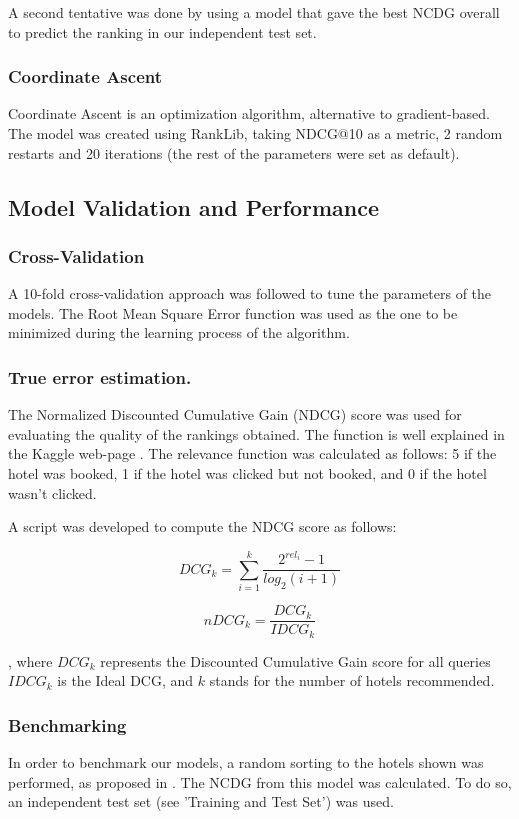 \documentclass[9pt]{llncs}
\begin{document}
A second tentative was done by using a model that gave the best NCDG overall to predict the ranking in our independent test set.

\subsubsection{Coordinate Ascent}
Coordinate Ascent is an optimization algorithm, alternative to gradient-based.
The model was created using RankLib, taking NDCG@10 as a metric, 2 random restarts and 20 iterations (the rest of the parameters were set as default).


\subsection{Model Validation and Performance}
\subsubsection{Cross-Validation}
A 10-fold cross-validation approach was followed to tune the parameters of the models. The Root Mean Square Error function was used as the one to be minimized during the learning process of the algorithm.
\subsubsection{True error estimation.}
The Normalized Discounted Cumulative Gain (NDCG) score was used for evaluating the quality of the rankings obtained. 
The function is well explained in the Kaggle web-page \cite{NDCG}.
The relevance function was calculated as follows: 5 if the hotel was booked, 1 if the hotel was clicked but not booked, and 0 if the hotel wasn't clicked.

A script was developed to compute the NDCG score as follows:

\begin{equation}
DCG_k = \sum_{i=1}^{k} \frac{2^{rel_i}-1}{log_2 (i+1)}
\end{equation}

\begin{equation}
nDCG_k = \frac{DCG_k}{IDCG_k}
\end{equation}

, where $DCG_k$ represents the Discounted Cumulative Gain score for all queries  $IDCG_k$ is the Ideal DCG, and $k$ stands for the number of hotels recommended.

\subsubsection{Benchmarking}
In order to benchmark our models, a random sorting to the hotels shown was performed, as proposed in \cite{AgarwalLearnQueries}. The NCDG from this model was calculated.
To do so, an independent test set (see 'Training and Test Set') was used.
\end{document}
